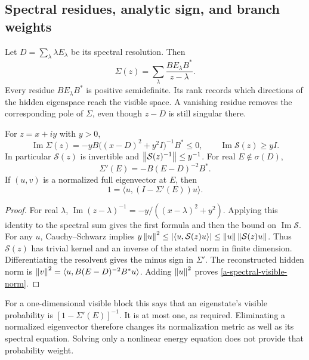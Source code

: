 \subsection{Spectral residues, analytic sign, and branch weights}

Let $D=\sum_\lambda\lambda E_\lambda$ be its spectral resolution. Then
\begin{equation}
 \Sigma(z)=\sum_\lambda\frac{B E_\lambda B^*}{z-\lambda}.
 \label{a-spectral-self-energy-residues}
\end{equation}
Every residue $B E_\lambda B^*$ is positive semidefinite. Its rank records
which directions of the hidden eigenspace reach the visible space.
A vanishing residue removes the corresponding pole of $\Sigma$, even
though $z-D$ is still singular there.

\begin{proposition}
\label{a-spectral-resolvent-sign}
For $z=x+iy$ with $y>0$,
\[
 \operatorname{Im}\Sigma(z)
  =-yB\bigl((x-D)^2+y^2I\bigr)^{-1}B^*\leq0,
 \qquad
 \operatorname{Im}\mathcal S(z)\geq yI.
\]
In particular $\mathcal S(z)$ is invertible and
$\left\lVert\mathcal S(z)^{-1}\right\rVert\leq y^{-1}$.
For real $E\notin\sigma(D)$,
\[
 \Sigma'(E)=-B(E-D)^{-2}B^*.
\]
If $(u,v)$ is a normalized full eigenvector at $E$, then
\begin{equation}
 1=\langle u,(I-\Sigma'(E))u\rangle.
 \label{a-spectral-visible-norm}
\end{equation}
\end{proposition}
\begin{proof}
For real $\lambda$,
$\operatorname{Im}(z-\lambda)^{-1}=-y/((x-\lambda)^2+y^2)$.
Applying this identity to the spectral sum gives the first formula and
then the bound on $\operatorname{Im}\mathcal S$.
For any $u$, Cauchy--Schwarz implies
$y\left\lVert u\right\rVert^2\leq|\langle u,\mathcal S(z)u\rangle|
\leq\left\lVert u\right\rVert\left\lVert\mathcal S(z)u\right\rVert$.
Thus $\mathcal S(z)$ has trivial kernel and an inverse of the stated
norm in finite dimension. Differentiating the resolvent gives the minus
sign in $\Sigma'$. The reconstructed hidden norm is
$\left\lVert v\right\rVert^2=\langle u,B(E-D)^{-2}B^*u\rangle$.
Adding $\left\lVert u\right\rVert^2$ proves \eqref{a-spectral-visible-norm}.
\end{proof}

For a one-dimensional visible block this says that an eigenstate's
visible probability is $[1-\Sigma'(E)]^{-1}$. It is at most one, as
required. Eliminating a normalized eigenvector therefore changes its
normalization metric as well as its spectral equation. Solving only a
nonlinear energy equation does not provide that probability weight.

